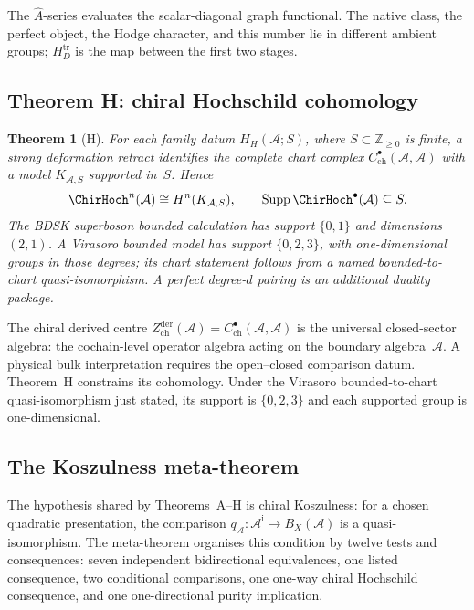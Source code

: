 \documentclass[11pt,reqno]{amsart}
\newtheorem{theorem}{Theorem}[section]
\theoremstyle{definition}
\theoremstyle{remark}
\newcommand{\cA}{\mathcal{A}}
\numberwithin{equation}{section}
\begin{document}
The $\hat A$-series evaluates the scalar-diagonal graph functional.
The native class, the perfect object, the Hodge character, and this
number lie in different ambient groups; $H_D^{\mathrm{tr}}$ is the
map between the first two stages.

\subsection{Theorem H: chiral Hochschild cohomology}
\label{ssec:thm-h}

\begin{theorem}[H]\label{thm:H}
For each family datum \(H_H(\cA;S)\), where
\(S\subset\mathbb Z_{\ge0}\) is finite, a strong deformation retract
identifies the complete chart complex
\(C^\bullet_{\mathrm{ch}}(\cA,\cA)\) with a model
\(K_{\cA,S}\) supported in~\(S\).  Hence
\[
\ChirHoch^n(\cA)\cong H^n(K_{\cA,S}),\qquad
\operatorname{Supp}\ChirHoch^\bullet(\cA)\subseteq S.
\]
The BDSK superboson bounded calculation has support
\(\{0,1\}\) and dimensions \((2,1)\).  A Virasoro bounded model has
support \(\{0,2,3\}\), with one-dimensional groups in those degrees;
its chart statement follows from a named bounded-to-chart
quasi-isomorphism.  A perfect degree-\(d\) pairing is an additional
duality package.
\end{theorem}

The chiral derived centre
$Z^{\mathrm{der}}_{\mathrm{ch}}(\cA) =
C^{\bullet}_{\mathrm{ch}}(\cA, \cA)$ is the universal
closed-sector algebra: the cochain-level operator algebra acting on
the boundary algebra~$\cA$. A physical bulk interpretation requires
the open--closed comparison datum. Theorem~H
constrains its cohomology.  Under the Virasoro bounded-to-chart
quasi-isomorphism just stated, its support is \(\{0,2,3\}\) and each
supported group is one-dimensional.

\subsection{The Koszulness meta-theorem}
\label{ssec:meta-theorem}

The hypothesis shared by Theorems~A--H is chiral
Koszulness: for a chosen quadratic presentation, the comparison
$q_\cA\colon\cA^{\mathrm i}\to B_X(\cA)$ is a quasi-isomorphism.
The meta-theorem organises this condition by
twelve tests and consequences: seven independent bidirectional
equivalences, one listed consequence, two conditional
comparisons, one one-way chiral Hochschild consequence, and one
one-directional purity implication.
\end{document}

